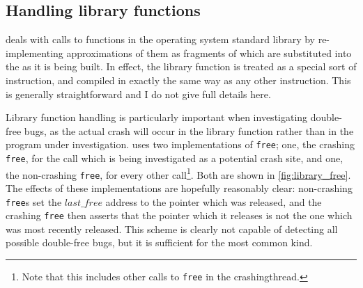 \subsection{Handling library functions}
\label{sect:derive:library_functions}

{\Technique} deals with calls to functions in the operating system
standard library by re-implementing approximations of them as
fragments of {\StateMachine} which are substituted into the
{\StateMachines} as it is being built.  In effect, the library
function is treated as a special sort of instruction, and compiled in
exactly the same way as any other instruction.  This is generally
straightforward and I do not give full details here.

 Library function handling is particularly
important when investigating double-free bugs, as the actual crash
will occur in the library function rather than in the program under
investigation.  {\Technique} uses two implementations of
\texttt{free}; one, the crashing \texttt{free}, for the call which is
being investigated as a potential crash site, and one, the
non-crashing \texttt{free}, for every other call\footnote{Note that
  this includes other calls to \texttt{free} in the
  \gls{crashingthread}.}.  Both are shown in
\autoref{fig:library_free}.  The effects of these implementations are
hopefully reasonably clear: non-crashing \texttt{free}s
set the $\mathit{last\_free}$ address to the pointer which was
released, and the crashing \texttt{free} then asserts that the pointer
which it releases is not the one which was most recently released.
This scheme is clearly not capable of detecting all possible
double-free bugs, but it is sufficient for the most common kind.

